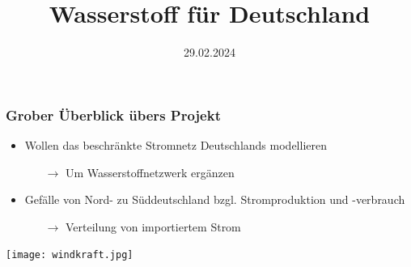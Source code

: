 \documentclass[aspectratio=169,t]{beamer}
\title{Wasserstoff für Deutschland}
\subtitle{}
\date{29.02.2024}
\author{}
\begin{document}
	
	\maketitle
	
	
	

	
	\begin{frame}
		\frametitle{Grober Überblick übers Projekt}
		\vspace*{-4mm}
		\begin{minipage}{1\linewidth}
			\begin{minipage}{.5\linewidth}
				
				\vspace*{-12mm}
				
		\begin{itemize}
			\item Wollen das beschränkte Stromnetz Deutschlands modellieren
			\vspace*{2mm}
			
			\begin{itemize}
				\item [$\rightarrow$] Um Wasserstoffnetzwerk ergänzen
			\end{itemize}
		\vspace*{2mm}
		
		\item Gefälle von Nord- zu Süddeutschland bzgl. Stromproduktion und -verbrauch
		\vspace*{2mm}
		
		\begin{itemize}
			\item [$\rightarrow$] Verteilung von importiertem Strom
		\end{itemize}
				 
		\end{itemize}
	\end{minipage}
\hfill
\begin{minipage}{.5\linewidth}
\centering
\texttt{[image: windkraft.jpg]}

\end{minipage}
\end{minipage}	
		
			
		
	\end{frame}
\end{document}
